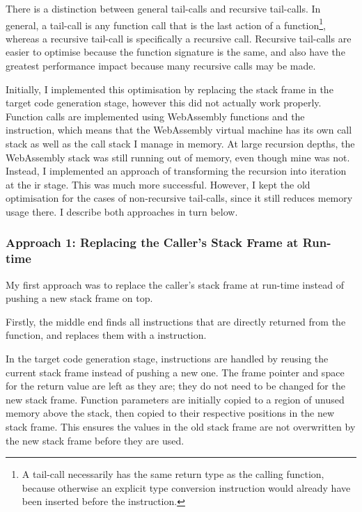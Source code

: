 \documentclass[00-main.tex]{subfiles}
\begin{document}
There is a distinction between general tail-calls and recursive tail-calls. In general, a tail-call is any function call that is the last action of a function\footnote{A tail-call necessarily has the same return type as the calling function, because otherwise an explicit type conversion instruction would already have been inserted before the  instruction.}, whereas a recursive tail-call is specifically a recursive call.
Recursive tail-calls are easier to optimise because the function signature is the same, and also have the greatest performance impact because many recursive calls may be made.

Initially, I implemented this optimisation by replacing the stack frame in the target code generation stage, however this did not actually work properly.
Function calls are implemented using WebAssembly functions and the  instruction, which means that the WebAssembly virtual machine has its own call stack as well as the call stack I manage in memory.
At large recursion depths, the WebAssembly stack was still running out of memory, even though mine was not.
Instead, I implemented an approach of transforming the recursion into iteration at the \gls{ir} stage.
This was much more successful.
However, I kept the old optimisation for the cases of non-recursive tail-calls, since it still reduces memory usage there.
I describe both approaches in turn below.

\subsubsection{Approach 1: Replacing the Caller's Stack Frame at Run-time}

My first approach was to replace the caller's stack frame at run-time instead of pushing a new stack frame on top.

Firstly, the middle end finds all  instructions that are directly returned from the function, and replaces them with a  instruction.

In the target code generation stage,  instructions are handled by reusing the current stack frame instead of pushing a new one.
The frame pointer and space for the return value are left as they are; they do not need to be changed for the new stack frame.
Function parameters are initially copied to a region of unused memory above the stack, then copied to their respective positions in the new stack frame. This ensures the values in the old stack frame are not overwritten by the new stack frame before they are used.
\end{document}
